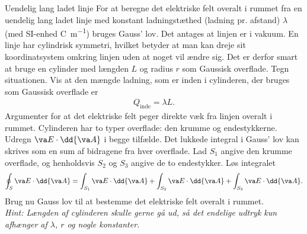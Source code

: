 \begin{opgave}{Uendelig lang ladet linje}
    For at beregne det elektriske felt overalt i rummet fra en uendelig lang ladet linje med konstant ladningstæthed (ladning pr. afstand) $\lambda$ (med SI-enhed \si{\coulomb\per\meter}) bruges Gauss' lov. Det antages at linjen er i vakuum. En linje har cylindrisk symmetri, hvilket betyder at man kan dreje sit koordinatsystem omkring linjen uden at noget vil ændre sig. Det er derfor smart at bruge en cylinder med længden $L$ og radius $r$ som Gaussisk overflade.
    \opg Tegn situationen.
    \opg Vis at den mængde ladning, som er inden i cylinderen, der bruges som Gaussisk overflade er
    \begin{align*}
        Q_\mathrm{inde} = \lambda L.
    \end{align*}
    \opg Argumenter for at det elektriske felt peger direkte væk fra linjen overalt i rummet.
    \opg Cylinderen har to typer overflade: den krumme og endestykkerne. Udregn $\va E \cdot \dd{\va A}$ i begge tilfælde.
    \opg Det lukkede integral i Gauss' lov kan skrives som en sum af bidragene fra hver overflade. Lad $S_1$ angive den krumme overflade, og henholdsvis $S_2$ og $S_3$ angive de to endestykker. Løs integralet
    \begin{align*}
        \oint_S \va E \cdot \dd{\va A} = \int_{S_1} \va E \cdot \dd{\va A} + \int_{S_2} \va E \cdot \dd{\va A} + \int_{S_3} \va E \cdot \dd{\va A}.
    \end{align*}
    \opg Brug nu Gauss lov til at bestemme det elektriske felt overalt i rummet. \\
    \textit{Hint: Længden af cylinderen skulle gerne gå ud, så det endelige udtryk kun afhænger af $\lambda$, $r$ og nogle konstanter.}
\end{opgave}

